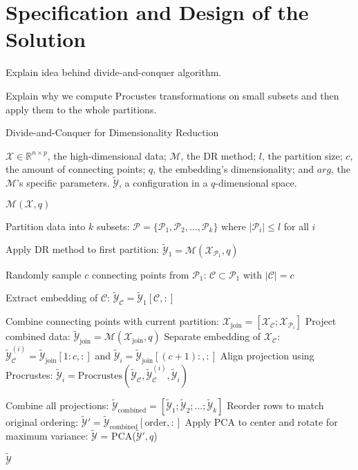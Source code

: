 \section{Specification and Design of the Solution}

Explain idea behind divide-and-conquer algorithm.

Explain why we compute Procustes transformations on small subsets and then apply them to the whole partitions.

\begin{algorithm}
    \caption{Divide-and-Conquer for Dimensionality Reduction}
    \label{alg:DivideConquer}
    
    \begin{algorithmic}[1]
    \REQUIRE $\mathcal{X} \in \mathbb{R}^{n \times p}$, the high-dimensional data; $\mathcal{M}$, the DR method; $l$, the partition size; $c$, the amount of connecting points; $q$, the embedding's dimensionality; and $arg$, the $\mathcal{M}$'s specific parameters.
    \ENSURE $\tilde{\mathcal{Y}}$, a configuration in a $q$-dimensional space.
    
        \RETURN $\mathcal{M}(\mathcal{X}, q)$
    \ENDIF
    
    \STATE Partition data into $k$ subsets: $\mathcal{P} = \{\mathcal{P}_1, \mathcal{P}_2, \ldots, \mathcal{P}_k\}$ where $|\mathcal{P}_i| \leq l$ for all $i$
    
    \STATE Apply DR method to first partition: $\tilde{\mathcal{Y}}_1 = \mathcal{M}(\mathcal{X}_{\mathcal{P}_1}, q)$
    
    \STATE Randomly sample $c$ connecting points from $\mathcal{P}_1$: $\mathcal{C} \subset \mathcal{P}_1$ with $|\mathcal{C}| = c$

    \STATE Extract embedding of $\mathcal{C}$: $\tilde{\mathcal{Y}}_\mathcal{C} = \tilde{\mathcal{Y}}_1[{\mathcal{C}},:]$
    
        \STATE Combine connecting points with current partition: $\mathcal{X}_{\text{join}} = [\mathcal{X}_{\mathcal{C}}; \mathcal{X}_{\mathcal{P}_i}]$
        \STATE Project combined data: $\tilde{\mathcal{Y}}_{\text{join}} = \mathcal{M}(\mathcal{X}_{\text{join}}, q)$
        \STATE Separate embedding of $\mathcal{X}_{\mathcal{C}}$: $\tilde{\mathcal{Y}}_{\mathcal{C}}^{(i)} = \tilde{\mathcal{Y}}_{\text{join}}[1:c,:]$ and $\tilde{\mathcal{Y}}_i = \tilde{\mathcal{Y}}_{\text{join}}[(c+1):,:]$
        \STATE Align projection using Procrustes: $\tilde{\mathcal{Y}}_i = \text{Procrustes}(\tilde{\mathcal{Y}}_\mathcal{C}, \tilde{\mathcal{Y}}_{\mathcal{C}}^{(i)}, \tilde{\mathcal{Y}}_i)$
    \ENDFOR
    
    \STATE Combine all projections: $\tilde{\mathcal{Y}}_{\text{combined}} = [\tilde{\mathcal{Y}}_1; \tilde{\mathcal{Y}}_2; \ldots; \tilde{\mathcal{Y}}_k]$
    \STATE Reorder rows to match original ordering: $\tilde{\mathcal{Y}}' = \tilde{\mathcal{Y}}_{\text{combined}}[\text{order},:]$
    \STATE Apply PCA to center and rotate for maximum variance: $\tilde{\mathcal{Y}}$ = PCA($\tilde{\mathcal{Y}}', q$)
    
    \RETURN $\tilde{\mathcal{Y}}$
    \end{algorithmic}
\end{algorithm}

